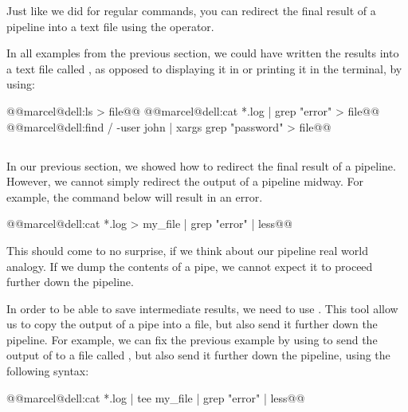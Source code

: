 Just like we did for regular commands, you can redirect the final result of a pipeline into a text file using the \mycommand{>} operator.

In all examples from the previous section, we could have written the results into a text file called , as opposed to displaying it in  or printing it in the terminal, by using:

\begin{command_line}[make]
@@marcel@dell:ls > file@@
@@marcel@dell:cat *.log | grep "error" > file@@
@@marcel@dell:find / -user john | xargs grep "password" > file@@
\end{command_line}

\subsection{}

In our previous section, we showed how to redirect the final result of a pipeline. However, we cannot simply redirect the output of a pipeline midway. For example, the command below will result in an error.

\begin{command_line}[make]
@@marcel@dell:cat *.log > my\_file | grep "error" | less@@
\end{command_line}

This should come to no surprise, if we think about our pipeline real world analogy. If we dump the contents of a pipe, we cannot expect it to proceed further down the pipeline.

In order to be able to save intermediate results, we need to use . This tool allow us to copy the output of a pipe into a file, but also send it further down the pipeline. For example, we can fix the previous example by using  to send the output of  to a file called , but also send it further down the pipeline, using the following syntax:

\begin{command_line}[make]
@@marcel@dell:cat *.log | tee my\_file | grep "error" | less@@
\end{command_line}
